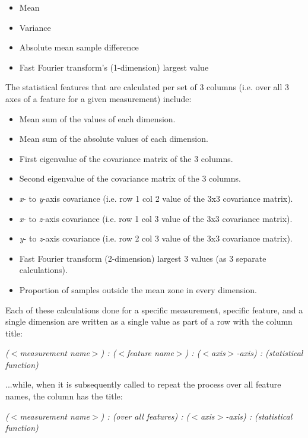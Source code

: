 \documentclass[12pt,twoside]{report}
\begin{document}
\begin{itemize}
	\item Mean
	\item Variance
	\item Absolute mean sample difference
	\item Fast Fourier transform's (1-dimension) largest value
\end{itemize}

\quad The statistical features that are calculated per set of 3 columns (i.e. over all 3 axes of a feature for a given measurement) include:
\begin{itemize}
	\item Mean sum of the values of each dimension.
	\item Mean sum of the absolute values of each dimension.
	\item First eigenvalue of the covariance matrix of the 3 columns.
	\item Second eigenvalue of the covariance matrix of the 3 columns.
	\item \textit{x}- to \textit{y}-axis covariance (i.e. row 1 col 2 value of the 3x3 covariance matrix).
	\item \textit{x}- to \textit{z}-axis covariance (i.e. row 1 col 3 value of the 3x3 covariance matrix).
	\item \textit{y}- to \textit{z}-axis covariance (i.e. row 2 col 3 value of the 3x3 covariance matrix).
	\item Fast Fourier transform (2-dimension) largest 3 values (as 3 separate calculations).
	\item Proportion of samples outside the mean zone in every dimension.
\end{itemize}

\quad Each of these calculations done for a specific measurement, specific feature, and a single dimension are written as a single value as part of a row with the column title:
\begin{center}
\textit{($<$measurement name$>$) : ($<$feature name$>$) : ($<$axis$>$-axis) : (statistical function)}\\
\end{center}

...while, when it is subsequently called to repeat the process over all feature names, the column has the title:
\begin{center}
\textit{($<$measurement name$>$) : (over all features) : ($<$axis$>$-axis) : (statistical function)}\\
\end{center}
\end{document}
